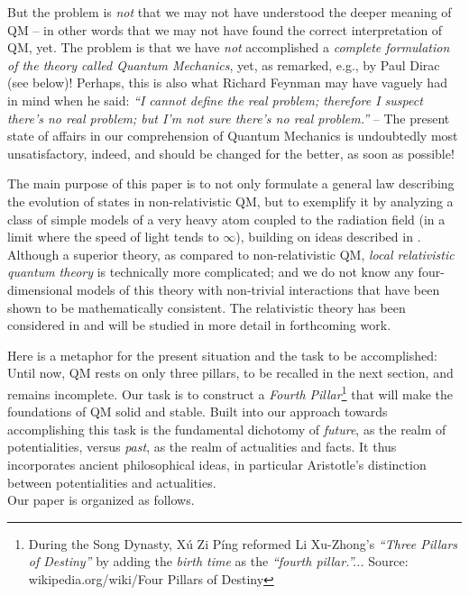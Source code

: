 \documentclass[12pt]{article}
\begin{document}
But the problem is \textit{not} that we may not have understood the deeper meaning of QM -- in other words that we may not
have found the correct interpretation of QM, yet. The problem is that we have \textit{not} accomplished a \textit{complete
formulation of the theory called Quantum Mechanics}, yet, as remarked, e.g., by {Paul Dirac} (see
below)!  Perhaps, this is also what {Richard Feynman} may have vaguely had in mind when he said:
\textit{``I cannot define the real problem; therefore I suspect there's no real problem; but I'm not sure there's no real problem.''}
-- The present state of affairs in our comprehension of Quantum Mechanics is undoubtedly most unsatisfactory,
indeed, and should be changed for the better, as soon as possible!

The main purpose of this paper is to not only formulate a general law describing the evolution of states in non-relativistic QM,
but to exemplify it by analyzing a class of simple models of a very heavy atom coupled to the radiation field (in a limit where
the speed of light tends to $\infty$), building on ideas described in \cite{F-Schub, BFS, Fr1, LMU-19}.  Although a superior theory,
as compared to non-relativistic QM, \textit{local relativistic quantum theory} is  technically more complicated; and we do
not  know any four-dimensional models of this theory with non-trivial interactions that have been shown to be mathematically
consistent. The relativistic theory has been considered in \cite{Fr2} and will be studied in more detail in forthcoming work.

Here is a metaphor for the present situation and the task to be accomplished: Until now, QM rests on  only
three pillars, to be recalled in the next section, and remains incomplete. Our task is to construct a \textit{Fourth Pillar}\footnote{During the Song Dynasty, X\'u Zi Píng reformed Li Xu-Zhong's \textit{``Three Pillars of Destiny''} by adding the \textit{birth time} as the \textit{``fourth pillar.''...} Source: wikipedia.org/wiki/Four Pillars of Destiny} that will
make the foundations of QM solid and stable. Built into our approach towards accomplishing this task is the fundamental
dichotomy of \textit{future}, as the realm of potentialities, versus \textit{past}, as the realm of actualities
and facts. It thus incorporates ancient philosophical ideas, in particular {Aristotle'}s distinction
between potentialities and actualities.\\

Our paper is organized as follows.\\
\end{document}
